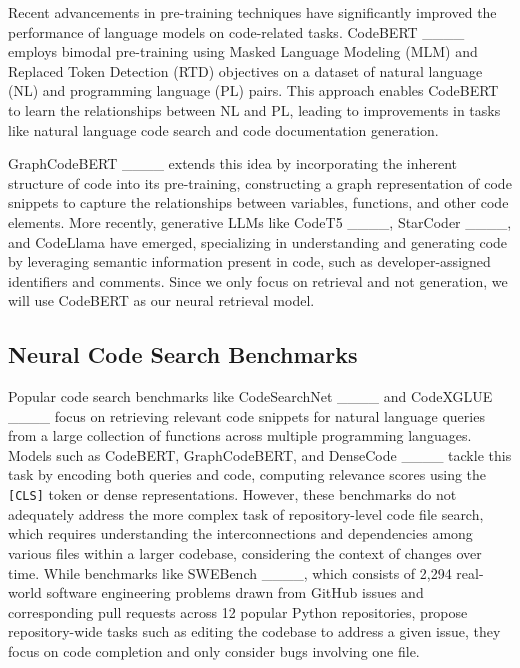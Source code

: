 Recent advancements in pre-training techniques have significantly improved the performance of language models on code-related tasks. CodeBERT ____ employs bimodal pre-training using Masked Language Modeling (MLM) and Replaced Token Detection (RTD) objectives on a dataset of natural language (NL) and programming language (PL) pairs. This approach enables CodeBERT to learn the relationships between NL and PL, leading to improvements in tasks like natural language code search and code documentation generation.

GraphCodeBERT ____ extends this idea by incorporating the inherent structure of code into its pre-training, constructing a graph representation of code snippets to capture the relationships between variables, functions, and other code elements. More recently, generative LLMs like CodeT5 ____, StarCoder ____, and CodeLlama have emerged, specializing in understanding and generating code by leveraging semantic information present in code, such as developer-assigned identifiers and comments. Since we only focus on retrieval and not generation, we will use CodeBERT as our neural retrieval model.

\subsection{Neural Code Search Benchmarks}
Popular code search benchmarks like CodeSearchNet ____ and CodeXGLUE ____ focus on retrieving relevant code snippets for natural language queries from a large collection of functions across multiple programming languages. Models such as CodeBERT, GraphCodeBERT, and DenseCode ____ tackle this task by encoding both queries and code, computing relevance scores using the \texttt{[CLS]} token or dense representations. However, these benchmarks do not adequately address the more complex task of repository-level code file search, which requires understanding the interconnections and dependencies among various files within a larger codebase, considering the context of changes over time. While benchmarks like SWEBench ____, which consists of 2,294 real-world software engineering problems drawn from GitHub issues and corresponding pull requests across 12 popular Python repositories, propose repository-wide tasks such as editing the codebase to address a given issue, they focus on code completion and only consider bugs involving one file.

